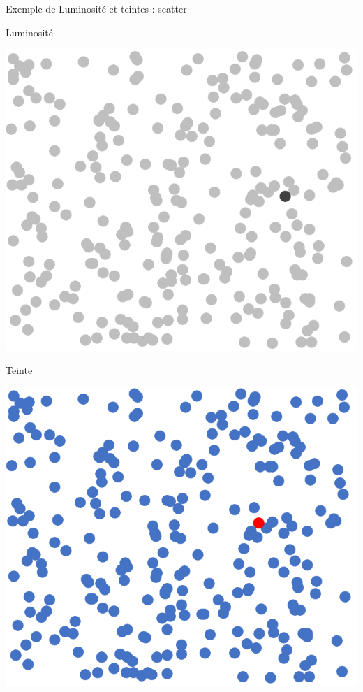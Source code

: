 \documentclass[french]{beamer}
\begin{document}
\begin{frame}{Exemple de Luminosité et teintes : scatter}
\begin{minipage}{.45\textwidth}
	\begin{center}
		Luminosité
		
		\includegraphics[width=\textwidth]{plotgrey}
	\end{center}
\end{minipage}
\hfill
\begin{minipage}{.45\textwidth}
	\begin{center}
		Teinte
		
		\includegraphics[width=\textwidth]{plothue}
	\end{center}
\end{minipage}
\end{frame}
\end{document}
